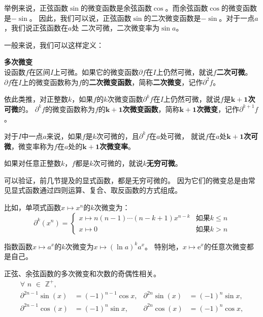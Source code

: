 \documentclass[12pt,UTF8]{ctexbook}
\begin{document}
举例来说，正弦函数$\sin$的微变函数是余弦函数$\cos$。而余弦函数$\cos$的微变函数是$-\sin$。
因此，我们可以说，正弦函数$\sin$的二次微变函数是$-\sin$。对于一点$a$，我们说正弦函数在$a$处
二次可微，二次微变率为$\sin{a}$。

一般来说，我们可以这样定义：
\begin{df}{\textbf{多次微变}}
    \mbox{} \\
    设函数$f$在区间$I$上可微。如果它的微变函数$\partial f$在$I$上仍然可微，就说$f$\textbf{二次可微}。
    $\partial f$在$I$上的微变函数称为$f$的\textbf{二次微变函数}，简称\textbf{二次微变}，记作$\partial^2 f$。
    
    依此类推，对正整数$k$，如果$f$的$k$次微变函数$\partial^k f$在$I$上仍然可微，就说$f$是$\boldsymbol{k+1}$\textbf{次可微}的。
    $\partial^k f$的微变函数称为$f$的$\boldsymbol{k+1}$\textbf{次微变函数}，简称$\boldsymbol{k+1}$\textbf{次微变}，记作$\partial^{k+1} f$。

    对于$I$中一点$a$来说，如果$f$是$k$次可微的，且$\partial^k f$在$a$处可微，
    就说$f$在$a$处$\boldsymbol{k+1}$\textbf{次可微}，微变率称为$f$在$a$处的$\boldsymbol{k+1}$\textbf{次微变率}。

    如果对任意正整数$k$，$f$都是$k$次可微的，就说$k$\textbf{无穷可微}。
\end{df}

可以验证，前几节提及的显式函数，都是无穷可微的。
因为它们的微变总是由常见显式函数通过四则运算、复合、取反函数的方式组成。

比如，单项式函数$x\mapsto x^n$的$k$次微变为：
$$ \partial^k (x^n) = \left\{
    \begin{array}{ll}
        x\mapsto n(n-1)\cdots(n-k+1) x^{n-k} & \mbox{如果} k \leqslant n \\
        x\mapsto 0 & \mbox{如果} k > n
    \end{array}\right.
$$

指数函数$x\mapsto a^x$的$k$次微变为$x\mapsto (\ln{a})^k a^x$。
特别地，$x\mapsto \mathrm{e}^x$的任意次微变都是自己。

正弦、余弦函数的多次微变和次数的奇偶性相关。
\begin{align*}
    \forall \,\,n\,\,\in\,\,\mathbb{Z}^+, \\
    \partial^{2n-1} \sin(x) &= (-1)^{n-1} \cos{x}, & \partial^{2n} \sin(x) &= (-1)^{n} \sin{x},  \\
    \partial^{2n-1} \cos(x) &= (-1)^{n} \sin{x}, & \partial^{2n} \cos(x) &= (-1)^{n} \cos{x},  
\end{align*}
\end{document}
